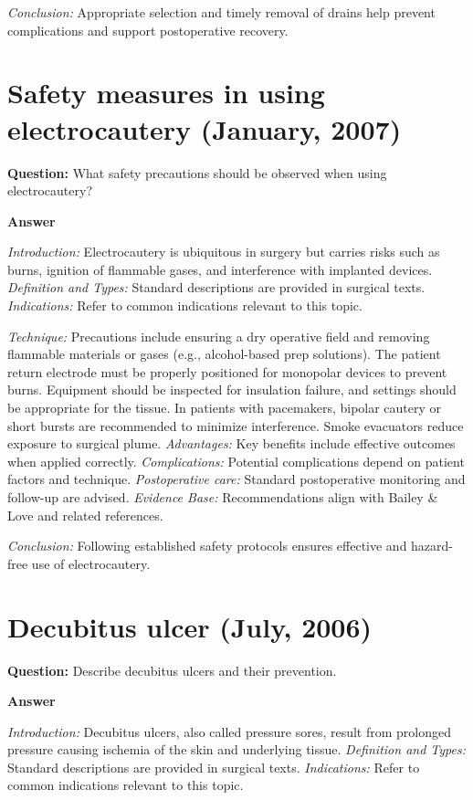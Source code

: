 \documentclass{article}
\begin{document}
\emph{Conclusion:} Appropriate selection and timely removal of drains help prevent complications and support postoperative recovery.


\section{Safety measures in using electrocautery (January, 2007)}

\textbf{Question:} What safety precautions should be observed when using electrocautery?

\textbf{Answer}

\emph{Introduction:} Electrocautery is ubiquitous in surgery but carries risks such as burns, ignition of flammable gases, and interference with implanted devices.
\emph{Definition and Types:} Standard descriptions are provided in surgical texts.
\emph{Indications:} Refer to common indications relevant to this topic.

\emph{Technique:} Precautions include ensuring a dry operative field and removing flammable materials or gases (e.g., alcohol-based prep solutions). The patient return electrode must be properly positioned for monopolar devices to prevent burns. Equipment should be inspected for insulation failure, and settings should be appropriate for the tissue. In patients with pacemakers, bipolar cautery or short bursts are recommended to minimize interference. Smoke evacuators reduce exposure to surgical plume.
\emph{Advantages:} Key benefits include effective outcomes when applied correctly.
\emph{Complications:} Potential complications depend on patient factors and technique.
\emph{Postoperative care:} Standard postoperative monitoring and follow-up are advised.
\emph{Evidence Base:} Recommendations align with Bailey \& Love and related references.

\emph{Conclusion:} Following established safety protocols ensures effective and hazard-free use of electrocautery.


\section{Decubitus ulcer (July, 2006)}

\textbf{Question:} Describe decubitus ulcers and their prevention.

\textbf{Answer}

\emph{Introduction:} Decubitus ulcers, also called pressure sores, result from prolonged pressure causing ischemia of the skin and underlying tissue.
\emph{Definition and Types:} Standard descriptions are provided in surgical texts.
\emph{Indications:} Refer to common indications relevant to this topic.
\end{document}
